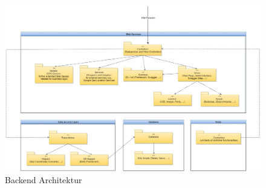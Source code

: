 \documentclass[a4paper,10pt,xetex]{article}
\begin{document}
\begin{figure}
  \centering
  \includegraphics{backend_architektur}
  \caption{Backend Architektur}
\end{figure}

\bigskip


\bigskip
\end{document}
